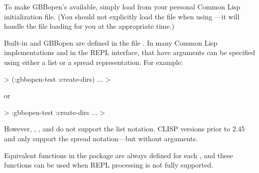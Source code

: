 \documentclass[10pt,twoside,english,pdftex]{article}
\begin{document}
To make GBBopen's  available, simply load
 from your personal Common
Lisp initialization file.  (You should not explicitly load the
 file when using
---it will handle the
 file loading for you at the
appropriate time.)

Built-in and GBBopen  are defined in the file
.  In many Common Lisp
implementations and in the
 REPL interface,
 that have arguments can be specified using either a list
or a spread representation.  For example:
%
\W\supp
\begin{example}
  > (:gbbopen-test :create-dirs)
       ...
  >
\end{example}
%
or
%
\W\supp\notpretop
\begin{example}
  > :gbbopen-test :create-dirs
       ...
  >
\end{example}
%
However, ,
, and
 do not support the list
notation.  CLISP versions prior to 2.45 and
 only support the spread
notation---but without arguments.

Equivalent functions in the  package are always
defined for each , and these functions can be used when
REPL  processing is not fully supported.
\end{document}
